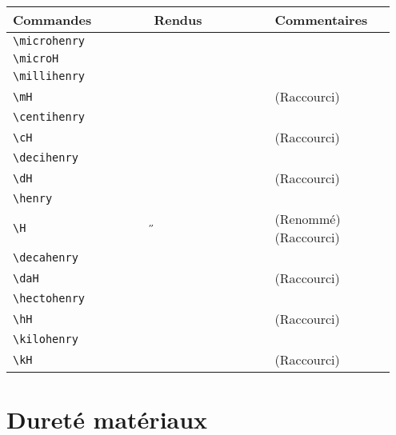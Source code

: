 \documentclass[a4paper,12pt]{article}
\newcommand{\rac}{({\color{red}Raccourci})}
\newcommand{\ren}{({\color{blue}Renommé})}
\begin{document}
	
	\noindent
	\begin{tabular}{|p{0.35\linewidth}|p{0.3\linewidth}|p{0.3\linewidth}|}
		\hline
 			\textbf{Commandes}&\textbf{Rendus}&\textbf{Commentaires}
 		\\\hline\hline
			\verb!\microhenry!	& 	\microhenry	&	\\
		\hline
			\verb!\microH!	& 	\microH	&	\\
		\hline
			\verb!\millihenry!	& 	\millihenry	&	\\
		\hline
			\verb!\mH!		& 	\mH		&	\rac\\
		\hline
			\verb!\centihenry!	& 	\centihenry	&	\\
		\hline
			\verb!\cH!		& 	\cH		&	\rac\\
		\hline
			\verb!\decihenry!	& 	\decihenry	&	\\
		\hline
			\verb!\dH!		& 	\dH		&	\rac\\
		\hline
			\verb!\henry!		& 	\henry		&	\\
		\hline
			\verb!\H!		& 	\H		&	\ren \rac\\
		\hline
			\verb!\decahenry!	& 	\decahenry	&	\\
		\hline
			\verb!\daH!		& 	\daH		&	\rac\\
		\hline
			\verb!\hectohenry!	& 	\hectohenry		&	\\
		\hline
			\verb!\hH!		& 	\hH		&	\rac\\
		\hline
			\verb!\kilohenry!	& 	\kilohenry		&	\\
		\hline
			\verb!\kH!		& 	\kH		&	\rac\\
		\hline
	\end{tabular}
	

	\section{Dureté matériaux}
	
\end{document}
